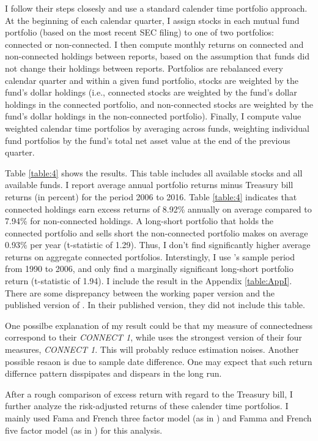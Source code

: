 \documentclass[11pt]{article}
\begin{document}
\begin{doublespace}
I follow their steps closesly and use a standard calender time portfolio approach. At the beginning of each calendar quarter, I assign stocks in each mutual fund portfolio (based on the most recent SEC filing) to one of two portfolios: connected or non-connected. I then compute monthly returns on connected and non-connected holdings between reports, based on the assumption that funds did not change their holdings between reports. Portfolios are rebalanced every calendar quarter and within a given fund portfolio, stocks are weighted by the fund’s dollar holdings (i.e., connected stocks are weighted by the fund’s dollar holdings in the connected portfolio, and non-connected stocks are weighted by the fund’s dollar holdings in the non-connected portfolio). Finally, I compute value weighted calendar time portfolios by averaging across funds, weighting individual fund portfolios by the fund’s total net asset value at the end of the previous quarter. 

Table \ref{table:4} shows the results. This table includes all available stocks
and all available funds. I report average annual portfolio returns minus Treasury bill
returns (in percent) for the period 2006 to 2016. Table \ref{table:4} indicates that connected holdings earn excess returns of 8.92\% annually on average compared to 7.94\% for non-connected holdings. A long-short portfolio that
holds the connected portfolio and sells short the non-connected portfolio makes on
average 0.93\% per year (t-statistic of 1.29). Thus, I don't find significantly higher average returns on aggregate connected portfolios. Interstingly, I use \cite{cohen2008small}'s sample period from 1990 to 2006, and only find a marginally significant long-short portfolio return (t-statistic of 1.94). I include the result in the Appendix \ref{table:AppI}. There are some disprepancy between the working paper version and the published version of \cite{cohen2008small}. In their published version, they did not include this table.  

One possilbe explanation of my result could be that my measure of connectedness correspond to their \emph{CONNECT 1}, while \cite{cohen2008small} uses the strongest version of their four measures, \emph{CONNECT 1}. This will probably reduce estimation noises. Another possible resaon is due to sample date difference. One may expect that such return differnce pattern disspipates and dispears in the long run.

After a rough comparison of excess return with regard to the Treasury bill, I further analyze the risk-adjusted returns of these calender time portfolios. I mainly used Fama and French three factor model (as in \cite{fama1993common} ) and Famma and French five factor model (as in \cite{fama2016dissecting}) for this analysis. 


\end{doublespace}
\end{document}
